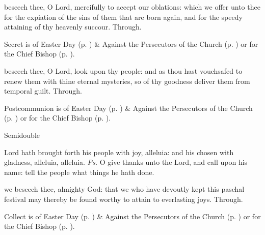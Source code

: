 
\secret
{} beseech thee, O Lord, mercifully to accept our oblations: which we offer unto thee for the expiation of the sins of them that are born again, and for the speedy attaining of thy heavenly succour. Through.
\begin{rubric}
     Secret is of Easter Day (p. \pageref{EasterSecret}) \&  Against the Persecutors of the Church (p. \pageref{SPAgainst}) or for the Chief Bishop (p. \pageref{SPChiefBishop}).
\end{rubric}



\postcommunion
{} beseech thee, O Lord, look upon thy people: and as thou hast vouchsafed to renew them with thine eternal mysteries, so of thy goodness deliver them from temporal guilt. Through.
\begin{rubric}
     Postcommunion is of Easter Day (p. \pageref{EasterPostcommunion}) \&  Against the Persecutors of the Church (p. \pageref{SPAgainst}) or for the Chief Bishop (p. \pageref{SPChiefBishop}).
\end{rubric}


\begin{inhead}
    {Semidouble}
\end{inhead}

\properantiphonfix

\introit
{} Lord hath brought forth his people with joy, alleluia: and his chosen with gladness, alleluia, alleluia. \textit{Ps.} O give thanks unto the Lord, and call upon his name: tell the people what things he hath done.

\collect
{} we beseech thee, almighty God: that we who have devoutly kept this paschal festival may thereby be found worthy to attain to everlasting joys. Through.
\begin{rubric}
     Collect is of Easter Day (p. \pageref{EasterCollect}) \&  Against the Persecutors of the Church (p. \pageref{SPAgainst}) or for the Chief Bishop (p. \pageref{SPChiefBishop}).
\end{rubric}

